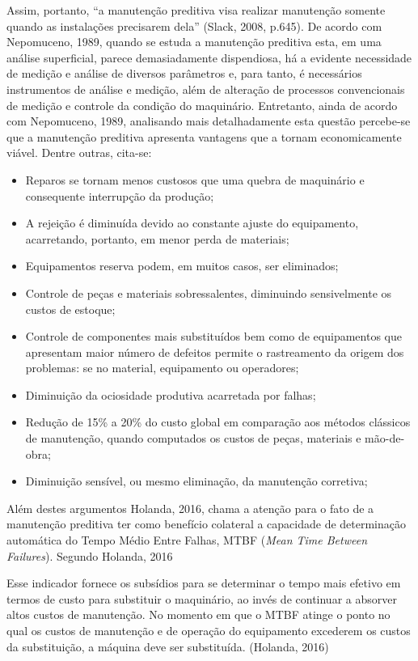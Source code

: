 \documentclass[
	12pt,				
	oneside,			
	a4paper,			
	english,			
	brazil				
	]{abntex2ppgsi}
\begin{document}
Assim, portanto, “a manutenção preditiva visa realizar manutenção somente quando as instalações precisarem dela” (Slack, 2008, p.645). 
De acordo com Nepomuceno, 1989, quando se estuda a manutenção preditiva esta, em uma análise superficial, parece demasiadamente dispendiosa, há a evidente necessidade de medição e análise de diversos parâmetros e, para tanto, é necessários instrumentos de análise e medição, além de alteração de processos convencionais de medição e controle da condição do maquinário. Entretanto, ainda de acordo com Nepomuceno, 1989, analisando mais detalhadamente esta questão percebe-se que a manutenção preditiva apresenta vantagens que a tornam economicamente viável. Dentre outras, cita-se: 


\begin{itemize}
	\item Reparos se tornam menos custosos que uma quebra de maquinário e consequente interrupção da produção;
	\item A rejeição é diminuída devido ao constante ajuste do equipamento, acarretando, portanto, em menor perda de materiais;
	\item Equipamentos reserva podem, em muitos casos, ser eliminados;
	\item Controle de peças e materiais sobressalentes, diminuindo sensivelmente os custos de estoque;
	\item Controle de componentes mais substituídos bem como de equipamentos que apresentam maior número de defeitos permite o rastreamento da origem dos problemas: se no material, equipamento ou operadores;
	\item Diminuição da ociosidade produtiva acarretada por falhas;
	\item Redução de 15\% a 20\% do custo global em comparação aos métodos clássicos de manutenção, quando computados os custos de peças, materiais e mão-de-obra;
	\item Diminuição sensível, ou mesmo eliminação, da manutenção corretiva;
\end{itemize}

Além destes argumentos Holanda, 2016, chama a atenção para o fato de a manutenção preditiva ter como benefício colateral a capacidade de determinação automática do Tempo Médio Entre Falhas, MTBF (\textit{Mean Time Between Failures}). Segundo Holanda, 2016

\begin{citacao}
Esse indicador fornece os subsídios para se determinar o tempo mais efetivo em termos de custo para substituir o maquinário, ao invés de continuar a absorver altos custos de manutenção. No momento em que o MTBF atinge o ponto no qual os custos de manutenção e de operação do equipamento excederem os custos da substituição, a máquina deve ser substituída. (Holanda, 2016)
\end{citacao}
\end{document}
